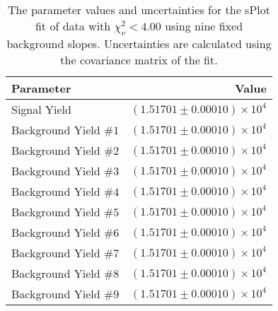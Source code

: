 
\begin{table}[h]
    \begin{center}
        \begin{tabular}{lr}\toprule
            Parameter & Value \\\midrule
            Signal Yield & $(1.51701 \pm 0.00010) \times 10^{4}$ \\
            Background Yield $\#1$ & $(1.51701 \pm 0.00010) \times 10^{4}$ \\
            Background Yield $\#2$ & $(1.51701 \pm 0.00010) \times 10^{4}$ \\
            Background Yield $\#3$ & $(1.51701 \pm 0.00010) \times 10^{4}$ \\
            Background Yield $\#4$ & $(1.51701 \pm 0.00010) \times 10^{4}$ \\
            Background Yield $\#5$ & $(1.51701 \pm 0.00010) \times 10^{4}$ \\
            Background Yield $\#6$ & $(1.51701 \pm 0.00010) \times 10^{4}$ \\
            Background Yield $\#7$ & $(1.51701 \pm 0.00010) \times 10^{4}$ \\
            Background Yield $\#8$ & $(1.51701 \pm 0.00010) \times 10^{4}$ \\
            Background Yield $\#9$ & $(1.51701 \pm 0.00010) \times 10^{4}$ \\\bottomrule
        \end{tabular}
        \caption{The parameter values and uncertainties for the sPlot fit of data with $\chi^2_\nu < 4.00$ using nine fixed background slopes. Uncertainties are calculated using the covariance matrix of the fit.}
    \end{center}
\end{table}
